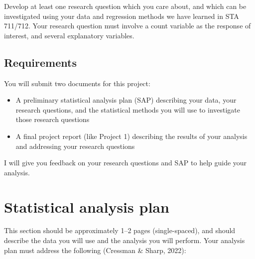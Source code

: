 \documentclass[11pt]{article}
\begin{document}
Develop at least one research question which you care about, and which can be investigated using your data and regression methods we have learned in STA 711/712. Your research question must involve a count variable as the response of interest, and several explanatory variables.

\subsection*{Requirements}

You will submit two documents for this project:
\begin{itemize}
\item A preliminary statistical analysis plan (SAP) describing your data, your research questions, and the statistical methods you will use to investigate those research questions

\item A final project report (like Project 1) describing the results of your analysis and addressing your research questions
\end{itemize}
I will give you feedback on your research questions and SAP to help guide your analysis.

\vspace{0.5cm}

\section*{Statistical analysis plan}

This section should be approximately 1--2 pages (single-spaced), and should describe the data you will use and the analysis you will perform. Your analysis plan must address the following (Cressman \& Sharp, 2022):
\end{document}
